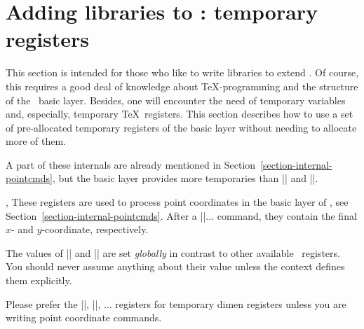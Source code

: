 %
%
%


\section{Adding libraries to \pgfname: temporary registers}
\label{section-internal-registers}

This section is intended for those who like to write libraries to extend
\pgfname. Of course, this requires a good deal of knowledge about
\TeX-programming and the structure of the \pgfname\ basic layer. Besides, one
will encounter the need of temporary variables and, especially, temporary \TeX\
registers. This section describes how to use a set of pre-allocated temporary
registers of the basic layer without needing to allocate more of them.

A part of these internals are already mentioned in
Section~\ref{section-internal-pointcmds}, but the basic layer provides more
temporaries than |\pgf@x| and |\pgf@y|.

\begin{internallist}[dimen register]{\pgf@x,\pgf@y}
    These registers are used to process point coordinates in the basic layer of
    \pgfname, see Section~\ref{section-internal-pointcmds}. After a
    |\pgfpoint|$\dotsc$ command, they contain the final $x$- and $y$-coordinate,
    respectively.

    The values of |\pgf@x| and |\pgf@y| are set \emph{globally} in contrast to
    other available \pgfname\ registers. You should never assume anything about
    their value unless the context defines them explicitly.

    Please prefer the |\pgf@xa|, |\pgf@xb|, $\dotsc$ registers for temporary
    dimen registers unless you are writing point coordinate commands.
\end{internallist}

